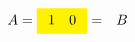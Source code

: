 \documentclass{article}
\begin{document}
\begin{eqnarray*}
A=\colorbox{yellow}{$\begin{array}{cc}1 &0\end{array}$}&=&B
\end{eqnarray*}
\end{document}
